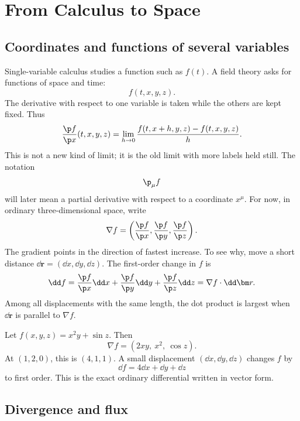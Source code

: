 \chapter{From Calculus to Space}


\section{Coordinates and functions of several variables}

Single-variable calculus studies a function such as \(f(t)\).  A field theory asks for functions of space and time:
\[
  f(t,x,y,z).
\]
The derivative with respect to one variable is taken while the others are kept fixed.  Thus
\[
  \frac{\p f}{\p x}(t,x,y,z)
  =
  \lim_{h\to 0}
  \frac{f(t,x+h,y,z)-f(t,x,y,z)}{h}.
\]
This is not a new kind of limit; it is the old limit with more labels held still.  The notation
\[
  \p_\mu f
\]
will later mean a partial derivative with respect to a coordinate \(x^\mu\).  For now, in ordinary three-dimensional space, write
\[
  \nabla f
  =
  \left(
  \frac{\p f}{\p x},
  \frac{\p f}{\p y},
  \frac{\p f}{\p z}
  \right).
\]
The gradient points in the direction of fastest increase.  To see why, move a short distance \(\dd \bm r=(\dd x,\dd y,\dd z)\).  The first-order change in \(f\) is
\[
  \dd f
  =
  \frac{\p f}{\p x}\dd x
  +\frac{\p f}{\p y}\dd y
  +\frac{\p f}{\p z}\dd z
  =
  \nabla f\cdot \dd\bm r .
\]
Among all displacements with the same length, the dot product is largest when \(\dd\bm r\) is parallel to \(\nabla f\).

\begin{example}
Let \(f(x,y,z)=x^2y+\sin z\).  Then
\[
  \nabla f=(2xy,\ x^2,\ \cos z).
\]
At \((1,2,0)\), this is \((4,1,1)\).  A small displacement \((\dd x,\dd y,\dd z)\) changes \(f\) by
\[
  \dd f=4\dd x+\dd y+\dd z
\]
to first order.  This is the exact ordinary differential written in vector form.
\end{example}

\section{Divergence and flux}

